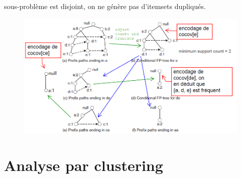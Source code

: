\documentclass[letterpaper, 12pt]{article}
\begin{document}
				sous-problème est disjoint, on ne génère pas d'itemsets
				dupliqués.
			\begin{figure}[H]
				\centering
				\includegraphics[scale=0.625]{Images/fptree_3}
				\caption{}
				\label{fig:fptree:3}
			\end{figure}\noindent
%
\part{Analyse par clustering}
%
\end{document}
